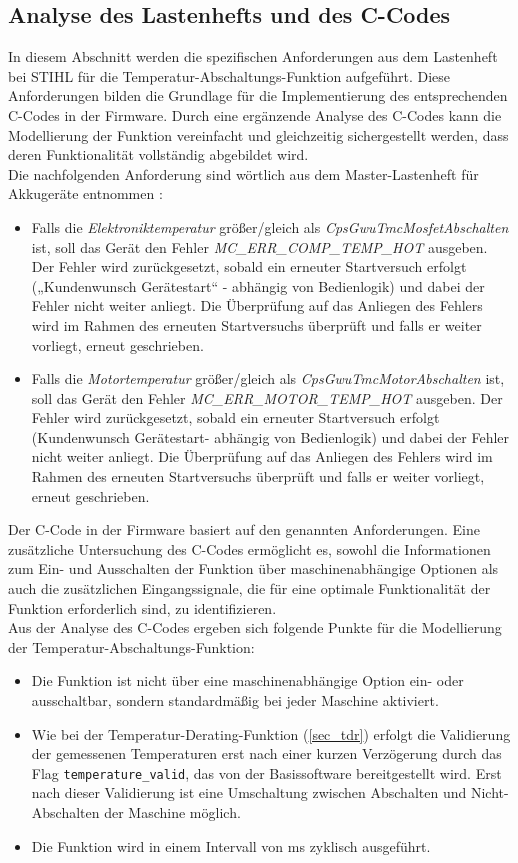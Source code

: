 \subsection{Analyse des Lastenhefts und des C-Codes}
\label{subsec_tas_analyse}
In diesem Abschnitt werden die spezifischen Anforderungen aus dem Lastenheft bei STIHL für die Temperatur-Abschaltungs-Funktion aufgeführt. Diese Anforderungen bilden die Grundlage für die Implementierung des entsprechenden C-Codes in der Firmware. Durch eine ergänzende Analyse des C-Codes kann die Modellierung der Funktion vereinfacht und gleichzeitig sichergestellt werden, dass deren Funktionalität vollständig abgebildet wird. \\
Die nachfolgenden Anforderung sind wörtlich aus dem Master-Lastenheft für Akkugeräte entnommen \cite{Lastenheft}:
\begin{itemize}
\item Falls die \textit{Elektroniktemperatur} größer\slash gleich als \textit{CpsGwuTmcMosfetAbschalten} ist, soll das Gerät den Fehler \textit{MC\_ERR\_COMP\_TEMP\_HOT} ausgeben. Der Fehler wird zurückgesetzt, sobald ein erneuter Startversuch erfolgt („Kundenwunsch Gerätestart“ - abhängig von Bedienlogik) und dabei der Fehler nicht weiter anliegt. Die Überprüfung auf das Anliegen des Fehlers wird im Rahmen des erneuten Startversuchs überprüft und falls er weiter vorliegt, erneut geschrieben.
\item Falls die \textit{Motortemperatur} größer/gleich als \textit{CpsGwuTmcMotorAbschalten} ist, soll das Gerät den Fehler \textit{MC\_ERR\_MOTOR\_TEMP\_HOT} ausgeben. Der Fehler wird zurückgesetzt, sobald ein erneuter Startversuch erfolgt (\glqq Kundenwunsch Gerätestart\grqq - abhängig von Bedienlogik) und dabei der Fehler nicht weiter anliegt. Die Überprüfung auf das Anliegen des Fehlers wird im Rahmen des erneuten Startversuchs überprüft und falls er weiter vorliegt, erneut geschrieben.
\end{itemize}
Der C-Code in der Firmware basiert auf den genannten Anforderungen. Eine zusätzliche Untersuchung des C-Codes ermöglicht es, sowohl die Informationen zum Ein- und Ausschalten der Funktion über maschinenabhängige Optionen als auch die zusätzlichen Eingangssignale, die für eine optimale Funktionalität der Funktion erforderlich sind, zu identifizieren. \\
Aus der Analyse des C-Codes \cite{Firmware_gesamt} ergeben sich folgende Punkte für die Modellierung der Temperatur-Abschaltungs-Funktion:
\begin{itemize}
\item Die Funktion ist nicht über eine maschinenabhängige Option ein- oder ausschaltbar, sondern standardmäßig bei jeder Maschine aktiviert.
\item Wie bei der Temperatur-Derating-Funktion (\autoref{sec_tdr}) erfolgt die Validierung der gemessenen Temperaturen erst nach einer kurzen Verzögerung durch das Flag \lstinline{temperature_valid}, das von der Basissoftware bereitgestellt wird. Erst nach dieser Validierung ist eine Umschaltung zwischen Abschalten und Nicht-Abschalten der Maschine möglich.
\item Die Funktion wird in einem Intervall von \unit[10]{ms} zyklisch ausgeführt.
\end{itemize}
